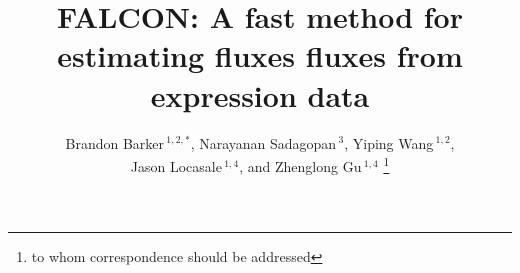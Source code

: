 \documentclass{bioinfo}
\begin{document}





\title[FALCON]{FALCON: A fast method for estimating fluxes fluxes
  from expression data} 
  \author[Barker \textit{et~al}]{Brandon Barker\,$^{1,2,*}$, 
    Narayanan Sadagopan\,$^{3}$, Yiping Wang\,$^{1,2}$, \\
    Jason Locasale\,$^{1,4}$, and Zhenglong Gu\,$^{1,4}$
    \footnote{to whom correspondence should be addressed}
  }

\address{$^{1}$Tri-Institutional Training Program in Computational
  Biology and Medicine, 1300 York Avenue, Box 194, New York, NY 10065\\
  $^{2}$Department of Biological Statistics and Computational Biology, 
    Cornell University, 1198 Comstock Hall, Ithaca, NY 14853-2601\\
  $^{3}$College of Engineering, Cornell University, Carpenter Hall, 
    Ithaca, NY 14853-2201\\
  $^{4}$Division of Nutritional Sciences, Cornell University, 
    Savage Hall, Ithaca, NY 14853-2201\\}


\maketitle
\end{document}
